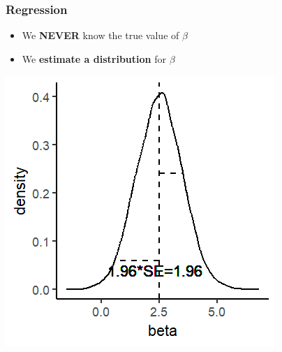 \documentclass[xcolor=x11names,compress]{beamer}\usepackage[]{graphicx}\usepackage[]{color}
\makeatletter
\def\maxwidth{ %
  \ifdim\Gin@nat@width>\linewidth
    \linewidth
  \else
    \Gin@nat@width
  \fi
}
\newenvironment{knitrout}{}{} %
\renewcommand{\(}{\begin{columns}}
\renewcommand{\)}{\end{columns}}
\newcommand{\<}[1]{\begin{column}{#1}}
\renewcommand{\>}{\end{column}}
\makeatother
\begin{document}
\begin{frame}
\frametitle{Regression}
\begin{itemize}
\item We \textbf{NEVER} know the true value of $\beta$
\item We \textbf{estimate a distribution} for $\beta$
\end{itemize}
\begin{knitrout}
\color{fgcolor}
\includegraphics[width=\maxwidth]{figure/beta_dist4-1} 

\end{knitrout}
\end{frame}
\end{document}
